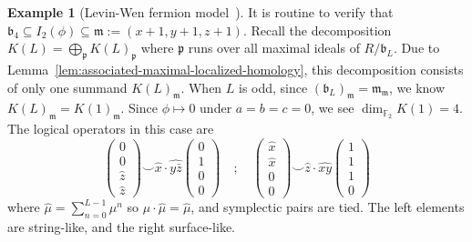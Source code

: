 \documentclass[letterpaper,12pt]{amsart}
\theoremstyle{definition} \newtheorem{defn}{Definition}
\theoremstyle{definition} \newtheorem{rem}{Remark}
\theoremstyle{definition} \newtheorem{example}{Example}
\newcommand{\FF}{\mathbb{F}}
\newcommand{\mm}{\mathfrak{m}}
\newcommand{\pp}{\mathfrak{p}}
\newcommand{\bb}{\mathfrak{b}}
\begin{document}
\begin{example}[Levin-Wen fermion model~\cite{LevinWen2003Fermions}]
It is routine to verify that $\bb_4 \subseteq I_2(\phi) \subseteq \mm := (x+1,y+1,z+1)$.
Recall the decomposition $K(L) = \bigoplus_\pp K(L)_\pp$ where $\pp$ runs over all maximal ideals of $R/\bb_L$.
Due to Lemma~\ref{lem:associated-maximal-localized-homology}, this decomposition consists of only one summand $K(L)_\mm$.
When $L$ is odd, since $(\bb_L)_\mm = \mm_\mm$, we know $K(L)_\mm = K(1)_\mm$.
Since $\phi \mapsto 0$ under $a=b=c=0$, we see $\dim_{\FF_2} K(1) = 4$.
The logical operators in this case are
\[
 \begin{pmatrix}  0 \\ 0 \\ \widehat z  \\ \widehat z  \end{pmatrix}
\smile
 \widehat x \cdot \widehat{y \bar z}
 \begin{pmatrix}  0 \\ 1 \\ 0 \\ 0 \end{pmatrix}
%
 \quad ; \quad
%
 \begin{pmatrix}  \widehat x \\ \widehat x \\ 0 \\ 0 \end{pmatrix}
\smile
 \widehat z \cdot \widehat{x y} 
 \begin{pmatrix}  1 \\ 1 \\ 1 \\ 0 \end{pmatrix}
\]
where $\widehat \mu = \sum_{n=0}^{L-1} \mu^n$ so $\mu \cdot \widehat \mu = \widehat \mu$,
and symplectic pairs are tied.
The left elements are string-like, and the right surface-like.


\end{example}
\end{document}
